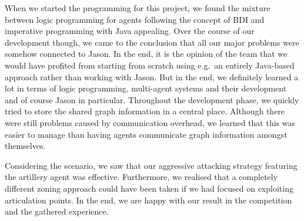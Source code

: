 When we started the programming for this project, we found the mixture between logic programming for agents following the concept of BDI and imperative programming with Java appealing.
Over the course of our development though, we came to the conclusion that all our major problems were somehow connected to Jason.
In the end, it is the opinion of the team that we  would have profited from starting from scratch using e.g.\ an entirely Java-based approach rather than working with Jason.
But in the end, we definitely learned a lot in terms of logic programming, multi-agent systems and their development and of course Jason in particular.
Throughout the development phase, we quickly tried to store the shared graph information in a central place.
Although there were still problems caused by communication overhead, we learned that this was easier to manage than having agents communicate graph information amongst themselves.

Considering the \mars scenario, we saw that our aggressive attacking strategy featuring the artillery agent was effective.
Furthermore, we realised that a completely different zoning approach could have been taken if we had focused on exploiting articulation points.
In the end, we are happy with our result in the competition and the gathered experience.
